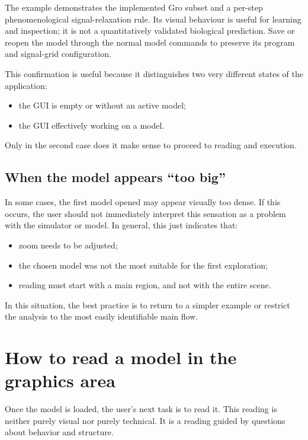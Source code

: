 The example demonstrates the implemented Gro subset and a per-step
phenomenological signal-relaxation rule. Its visual behaviour is useful for
learning and inspection; it is not a quantitatively validated biological
prediction. Save or reopen the model through the normal model commands to
preserve its program and signal-grid configuration.

This confirmation is useful because it distinguishes two very different states of the application:
\begin{itemize}
\item the GUI is empty or without an active model;
\item the GUI effectively working on a model.
\end{itemize}

Only in the second case does it make sense to proceed to reading and execution.

\subsection{When the model appears ``too big''}
\label{subsec:cap4_modelo_grande_demais}

In some cases, the first model opened may appear visually too dense. If this occurs, the user should not immediately interpret this sensation as a problem with the simulator or model. In general, this just indicates that:
\begin{itemize}
\item zoom needs to be adjusted;
\item the chosen model was not the most suitable for the first exploration;
\item reading must start with a main region, and not with the entire scene.
\end{itemize}

In this situation, the best practice is to return to a simpler example or restrict the analysis to the most easily identifiable main flow.

\section{How to read a model in the graphics area}
\label{sec:cap4_como_ler_modelo_area_grafica}

Once the model is loaded, the user's next task is to read it. This reading is neither purely visual nor purely technical. It is a reading guided by questions about behavior and structure.

